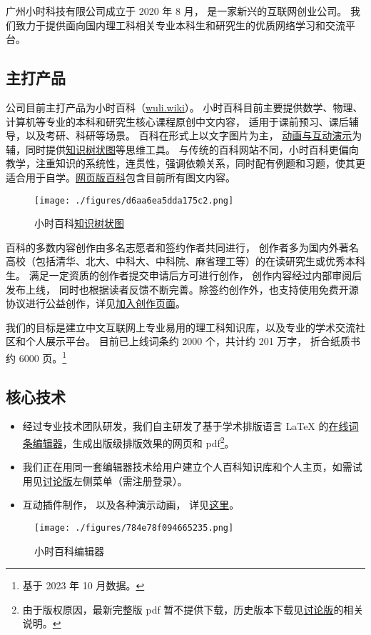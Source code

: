 
广州小时科技有限公司成立于 2020 年 8 月， 是一家新兴的互联网创业公司。 我们致力于提供面向国内理工科相关专业本科生和研究生的优质网络学习和交流平台。


\subsection{主打产品}
公司目前主打产品为小时百科（\href{https://wuli.wiki}{wuli.wiki}）。 小时百科目前主要提供数学、物理、计算机等专业的本科和研究生核心课程原创中文内容， 适用于课前预习、课后辅导，以及考研、科研等场景。 百科在形式上以文字图片为主， \href{https://wuli.wiki/apps/}{动画与互动演示}为辅，同时提供\href{https://wuli.wiki/tree/}{知识树状图}等思维工具。 与传统的百科网站不同，小时百科更偏向教学，注重知识的系统性，连贯性，强调依赖关系，同时配有例题和习题，使其更适合用于自学。\href{https://wuli.wiki/online/}{网页版百科}包含目前所有图文内容。

\begin{figure}[ht]
\centering
\texttt{[image: ./figures/d6aa6ea5dda175c2.png]}
\caption{小时百科\href{https://wuli.wiki/tree/}{知识树状图}} \label{fig_Compny_2}
\end{figure}

百科的多数内容创作由多名志愿者和签约作者共同进行， 创作者多为国内外著名高校（包括清华、北大、中科大、中科院、麻省理工等）的在读研究生或优秀本科生。 满足一定资质的创作者提交申请后方可进行创作， 创作内容经过内部审阅后发布上线， 同时也根据读者反馈不断完善。除签约创作外，也支持使用免费开源协议进行公益创作，详见\href{https://wuli.wiki/forum/f9ec7f8e-ca37-4278-a77e-ba5c0e40e115}{加入创作页面}。

我们的目标是建立中文互联网上专业易用的理工科知识库，以及专业的学术交流社区和个人展示平台。 目前已上线词条约 2000 个，共计约 201 万字， 折合纸质书约 6000 页。\footnote{基于 2023 年 10 月数据。}

\subsection{核心技术}
\begin{itemize}
\item 经过专业技术团队研发，我们自主研发了基于学术排版语言 LaTeX 的\href{https://wuli.wiki/editor/}{在线词条编辑器}，生成出版级排版效果的网页和 pdf\footnote{由于版权原因，最新完整版 pdf 暂不提供下载，历史版本下载见\href{https://wuli.wiki/forum/}{讨论版}的相关说明。}。 
\item 我们正在用同一套编辑器技术给用户建立个人百科知识库和个人主页，如需试用见\href{https://wuli.wiki/forum/}{讨论版}左侧菜单（需注册登录）。
\item 互动插件制作， 以及各种演示动画， 详见\href{http://wuli.wiki/apps}{这里}。
\end{itemize}

\begin{figure}[ht]
\centering
\texttt{[image: ./figures/784e78f094665235.png]}
\caption{小时百科编辑器} \label{fig_Compny_1}
\end{figure}
